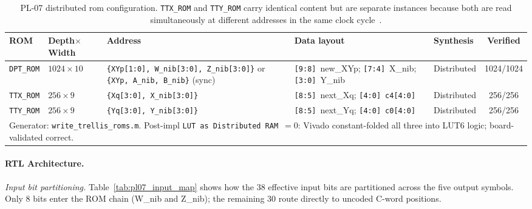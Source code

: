 \begin{table}[htbp]
  \caption{PL-07 distributed \ac{rom} configuration. \texttt{TTX\_ROM}
           and \texttt{TTY\_ROM} carry identical content but are
           separate instances because both are read simultaneously at
           different addresses in the same clock cycle~\cite{ITU_J83}.}
  \label{tab:pl07_rom_config}
  \centering
  \small
  \begin{tabular}{p{1.2cm}p{2.3cm}p{4.2cm}p{2.8cm}p{1.6cm}c}
    \hline
    ROM & Depth$\times$Width & Address & Data layout & Synthesis & Verified \\
    \hline
    \texttt{DPT\_ROM}
      & $1024\times10$
      & \texttt{\{XYp[1:0], W\_nib[3:0], Z\_nib[3:0]\}} or
        \texttt{\{XYp, A\_nib, B\_nib\}} (sync)
      & \texttt{[9:8]}~new\_XYp;\newline
        \texttt{[7:4]}~X\_nib;\newline
        \texttt{[3:0]}~Y\_nib
      & Distributed & 1024/1024 \\
    \texttt{TTX\_ROM}
      & $256\times9$
      & \texttt{\{Xq[3:0], X\_nib[3:0]\}}
      & \texttt{[8:5]}~next\_Xq;\newline
        \texttt{[4:0]}~\texttt{c4[4:0]}
      & Distributed & 256/256 \\
    \texttt{TTY\_ROM}
      & $256\times9$
      & \texttt{\{Yq[3:0], Y\_nib[3:0]\}}
      & \texttt{[8:5]}~next\_Yq;\newline
        \texttt{[4:0]}~\texttt{c0[4:0]}
      & Distributed & 256/256 \\
    \hline
    \multicolumn{6}{p{16cm}}{\small Generator: \texttt{write\_trellis\_roms.m}.
      Post-impl \texttt{LUT as Distributed RAM}~$= 0$: Vivado constant-folded
      all three into LUT6 logic; board-validated correct.} \\
  \end{tabular}
\end{table}


\FloatBarrier
\paragraph{RTL Architecture.}

\textit{Input bit partitioning.}
Table~\ref{tab:pl07_input_map} shows how the 38 effective input bits
are partitioned across the five output symbols.
Only 8 bits enter the ROM chain (W\_nib and Z\_nib); the remaining
30 route directly to uncoded C-word positions.

